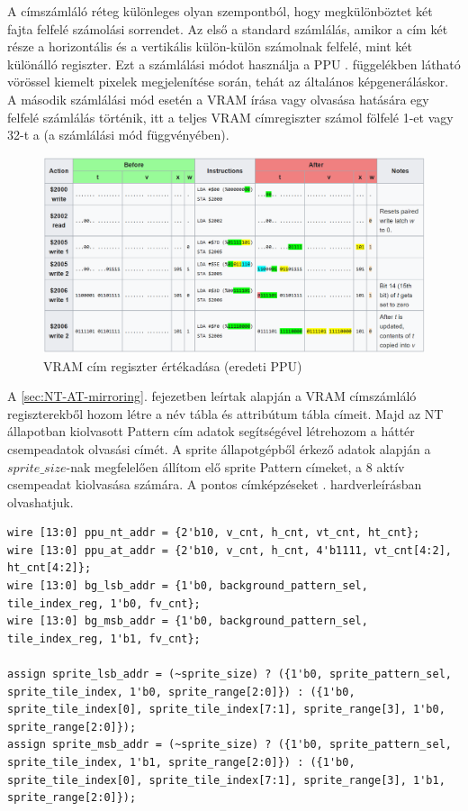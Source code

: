 	A címszámláló réteg különleges olyan szempontból, hogy megkülönböztet két fajta felfelé számolási sorrendet. Az első a standard számlálás, amikor a cím két része a horizontális és a vertikális külön-külön számolnak felfelé, mint két különálló regiszter. Ezt a számlálási módot használja a PPU . függelékben látható vörössel kiemelt pixelek megjelenítése során, tehát az általános képgeneráláskor. A második számlálási mód esetén a VRAM írása vagy olvasása hatására egy felfelé számlálás történik, itt a teljes VRAM címregiszter számol fölfelé 1-et vagy 32-t a (a számlálási mód függvényében). 
	
	\begin{figure}[H]
	\centering
	\includegraphics[width=150mm, keepaspectratio]{figures/2000-2005-2006-ppu-reg-writes}
	\caption{VRAM cím regiszter értékadása (eredeti PPU)} 
	\label{fig:2000-2005-2006-ppu-reg-writes}
	\end{figure} 
	
	A \ref{sec:NT-AT-mirroring}. fejezetben leírtak alapján a VRAM címszámláló regiszterekből hozom létre a név tábla és attribútum tábla címeit. Majd az NT  állapotban kiolvasott Pattern cím adatok segítségével létrehozom a háttér csempeadatok olvasási címét. A sprite állapotgépből érkező adatok alapján a $sprite\_size$-nak megfelelően állítom elő sprite Pattern címeket, a 8 aktív csempeadat kiolvasása számára. A pontos címképzéseket . hardverleírásban olvashatjuk.
	
\begin{lstlisting}[caption={VRAM cím képzése a számlálókból és az állapotgépek alapján}, label={code:VRAM-addr}, style=prettyverilog]
wire [13:0] ppu_nt_addr = {2'b10, v_cnt, h_cnt, vt_cnt, ht_cnt};
wire [13:0] ppu_at_addr = {2'b10, v_cnt, h_cnt, 4'b1111, vt_cnt[4:2], ht_cnt[4:2]};
wire [13:0] bg_lsb_addr = {1'b0, background_pattern_sel, tile_index_reg, 1'b0, fv_cnt};
wire [13:0] bg_msb_addr = {1'b0, background_pattern_sel, tile_index_reg, 1'b1, fv_cnt};

assign sprite_lsb_addr = (~sprite_size) ? ({1'b0, sprite_pattern_sel, sprite_tile_index, 1'b0, sprite_range[2:0]}) : ({1'b0, sprite_tile_index[0], sprite_tile_index[7:1], sprite_range[3], 1'b0, sprite_range[2:0]});
assign sprite_msb_addr = (~sprite_size) ? ({1'b0, sprite_pattern_sel, sprite_tile_index, 1'b1, sprite_range[2:0]}) : ({1'b0, sprite_tile_index[0], sprite_tile_index[7:1], sprite_range[3], 1'b1, sprite_range[2:0]});\end{lstlisting}

